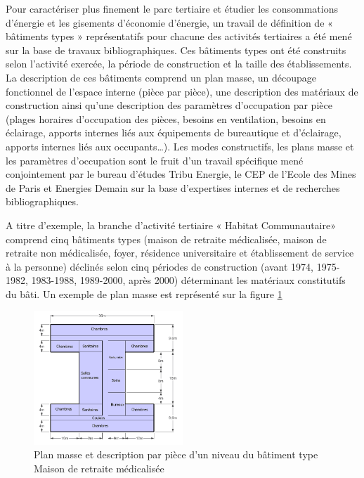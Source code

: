 \documentclass[10.5pt,a4paper]{article}
\begin{document}
{Pour caractériser plus finement le parc tertiaire et étudier les consommations d'énergie et les gisements d'économie d'énergie, un travail de définition de « bâtiments types » représentatifs pour chacune des activités tertiaires a été mené sur la base de travaux bibliographiques. 
Ces bâtiments types ont été construits selon l’activité exercée, la période de construction et la taille des établissements. La description de ces bâtiments comprend un plan masse, un découpage fonctionnel de l’espace interne (pièce par pièce), une description des matériaux de construction ainsi qu’une description des paramètres d’occupation par pièce (plages horaires d’occupation des pièces, besoins en ventilation, besoins en éclairage, apports internes liés aux équipements de bureautique et d’éclairage, apports internes liés aux occupants…). Les modes constructifs, les plans masse et les paramètres d’occupation sont le fruit d’un travail spécifique mené conjointement par le bureau d’études Tribu Energie, le CEP de l’Ecole des Mines de Paris et Energies Demain sur la base d’expertises internes et de recherches bibliographiques.

A titre d’exemple, la branche d’activité tertiaire « Habitat Communautaire» comprend cinq bâtiments types (maison de retraite médicalisée, maison de retraite non médicalisée, foyer, résidence universitaire et établissement de service à la personne) déclinés selon cinq périodes de construction (avant 1974, 1975-1982, 1983-1988, 1989-2000, après 2000) déterminant les matériaux constitutifs du bâti. Un exemple de plan masse est représenté sur la figure \ref{Plan_masse}

\begin{figure}[ht]
\centering
\caption{
Plan masse et description par pièce d’un niveau du bâtiment type \og Maison de retraite médicalisée\fg}\label{Plan_masse}
\includegraphics[width = 0.5\textwidth]{plan_masse}
\end{figure}

}
\end{document}
